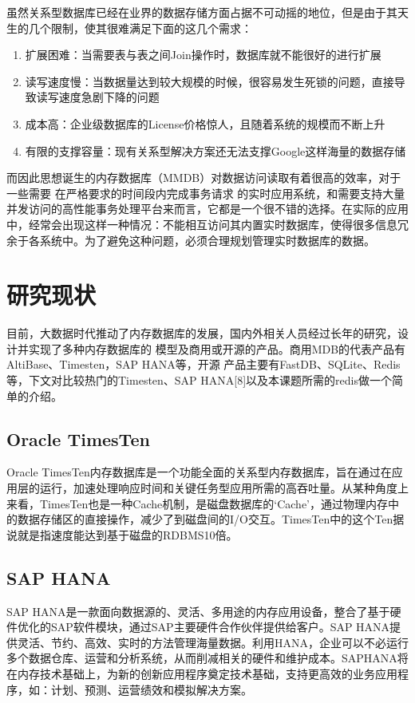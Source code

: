 \documentclass[proposal]{zjutreport}
\begin{document}
虽然关系型数据库已经在业界的数据存储方面占据不可动摇的地位，但是由于其天生的几个限制，使其很难满足下面的这几个需求：
\begin{enumerate}[label=（\arabic*）]
\item{扩展困难：当需要表与表之间Join操作时，数据库就不能很好的进行扩展}
\item{读写速度慢：当数据量达到较大规模的时候，很容易发生死锁的问题，直接导致读写速度急剧下降的问题}
\item{成本高：企业级数据库的License价格惊人，且随着系统的规模而不断上升}
\item{有限的支撑容量：现有关系型解决方案还无法支撑Google这样海量的数据存储}
\end{enumerate}

而因此思想诞生的内存数据库（MMDB）对数据访问读取有着很高的效率，对于一些需要
在严格要求的时间段内完成事务请求
的实时应用系统，和需要支持大量并发访问的高性能事务处理平台来而言，它都是一个很不错的选择。在实际的应用中，经常会出现这样一种情况：不能相互访问其内置实时数据库，使得很多信息冗余于各系统中。为了避免这种问题，必须合理规划管理实时数据库的数据。

\section{研究现状}
目前，大数据时代推动了内存数据库的发展，国内外相关人员经过长年的研究，设计并实现了多种内存数据库的
模型及商用或开源的产品。商用MDB的代表产品有AltiBase、Timesten，SAP HANA等，开源
产品主要有FastDB、SQLite、Redis等，下文对比较热门的Timesten、SAP HANA[8]以及本课题所需的redis做一个简单的介绍。

\subsection{Oracle TimesTen}
Oracle TimesTen内存数据库是一个功能全面的关系型内存数据库，旨在通过在应用层的运行，加速处理响应时间和关键任务型应用所需的高吞吐量。从某种角度上来看，TimesTen也是一种Cache机制，是磁盘数据库的‘Cache’，通过物理内存中的数据存储区的直接操作，减少了到磁盘间的I/O交互。TimesTen中的这个Ten据说就是指速度能达到基于磁盘的RDBMS10倍。

\subsection{SAP HANA}
SAP HANA是一款面向数据源的、灵活、多用途的内存应用设备，整合了基于硬件优化的SAP软件模块，通过SAP主要硬件合作伙伴提供给客户。SAP HANA提供灵活、节约、高效、实时的方法管理海量数据。利用HANA，企业可以不必运行多个数据仓库、运营和分析系统，从而削减相关的硬件和维护成本。SAPHANA将在内存技术基础上，为新的创新应用程序奠定技术基础，支持更高效的业务应用程序，如：计划、预测、运营绩效和模拟解决方案。
\end{document}
